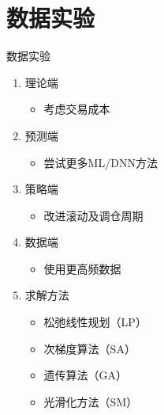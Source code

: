 \documentclass[CJK,aspectratio=169]{beamer}  %
\begin{document}
\section{数据实验}
\begin{frame}{数据实验}
	\begin{enumerate}
		\item 理论端
		\begin{itemize}
			\item 考虑交易成本
		\end{itemize}
		\item  预测端
		\begin{itemize}
			\item 尝试更多ML/DNN方法
		\end{itemize}
		\item  策略端
		\begin{itemize}
			\item 改进滚动及调仓周期
		\end{itemize}
		\item  数据端
		\begin{itemize}
			\item 使用更高频数据
		\end{itemize}
		\item  求解方法
		\begin{itemize}
			\item 松弛线性规划（LP）
			\item 次梯度算法（SA）
			\item 遗传算法（GA）
			\item 光滑化方法（SM）
		\end{itemize}
	\end{enumerate}
\end{frame}
\end{document}
